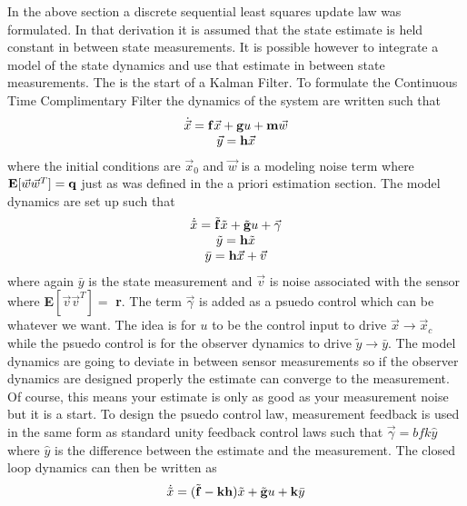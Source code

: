 \documentclass{article}
\begin{document}
In the above section a discrete sequential least squares update law
was formulated. In that derivation it is assumed that the state
estimate is held constant in between state measurements. It is
possible however to integrate a model of the state dynamics and use
that estimate in between state measurements. The is the start of a
Kalman Filter. To formulate the Continuous Time Complimentary Filter
the dynamics of the system are written such that
\begin{equation}
  \begin{matrix}
    \dot{\vec{x}} = {\bf f}\vec{x} + {\bf g}u +{\bf m}\vec{w} \\
    \vec{y} = {\bf h}\vec{x}
  \end{matrix}
\end{equation}
where the initial conditions are $\vec{x}_0$ and $\vec{w}$ is a
modeling noise term where ${\bf E}[\vec{w}\vec{w}^T]={\bf q}$ just as
was defined in the a priori estimation section. The model dynamics are
set up such that 
\begin{equation}
  \begin{matrix}
    \dot{\tilde{x}} = \tilde{{\bf f}}\tilde{x} + \tilde{{\bf g}}u + \vec{\gamma}\\
    \tilde{y} = {\bf h}\tilde{x} \\
    \bar{y} = {\bf h}\vec{x} + \vec{v}
  \end{matrix}
\end{equation}
where again $\bar{y}$ is the state measurement and $\vec{v}$ is noise
associated with the sensor where {\bf E}$[\vec{v}\vec{v}^T]=${\bf
  r}. The term $\vec{\gamma}$ is added as a psuedo control which can
be whatever we want. The idea is for $u$ to be the control input to
drive $\vec{x} \rightarrow \vec{x}_c$ while the psuedo control is for
the observer dynamics to drive $\tilde{y} \rightarrow \bar{y}$. The
model dynamics are going to deviate in between sensor measurements so
if the observer dynamics are designed properly the estimate can
converge to the measurement. Of course, this means your estimate is
only as good as your measurement noise but it is a start. To design
the psuedo control law, measurement feedback is used in the same form
as standard unity feedback control laws such that $\vec{\gamma} =
{bf k}\hat{y}$ where $\hat{y}$ is the difference between the estimate and
the measurement. The closed loop dynamics can then be written as
\begin{equation}
  \dot{\tilde{x}} = (\tilde{{\bf f}}-{\bf k}{\bf h})\tilde{x} + \tilde{{\bf g}}u
  + {\bf k}\bar{y}
\end{equation}
\end{document}
